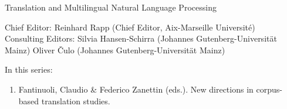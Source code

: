 {\large Translation and Multilingual Natural Language Processing}

\bigskip

Chief Editor: Reinhard Rapp (Chief Editor, Aix-Marseille Université) \\
Consulting Editors: Silvia Hansen-Schirra (Johannes Gutenberg-Universität Mainz)
Oliver Čulo (Johannes Gutenberg-Universität Mainz)

\bigskip

In this series:

\begin{enumerate}
\item Fantinuoli, Claudio \& Federico Zanettin (eds.). New directions in corpus-based translation studies.
\end{enumerate}



